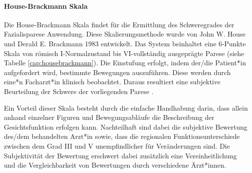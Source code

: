 \paragraph{House-Brackmann Skala} Die House-Brackmann Skala findet für die Ermittlung des Schweregrades der Fazialisparese Anwendung. Diese Skalierungsmethode wurde von John W. House und Derald E. Brackmann 1983 entwickelt. Das System beinhaltet eine 6-Punkte Skala von römisch I-Normalzustand bis VI-vollständig ausgeprägte Parese (siehe Tabelle \ref{cap:housebrackmann}). Die Einstufung erfolgt, indem der/die Patient*in aufgefordert wird, bestimmte Bewegungen auszuführen. Diese werden durch eine*n Facharzt*in klinisch beobachtet. Daraus resultiert eine subjektive Beurteilung der Schwere der vorliegenden Parese \cite{housebrackmann}.

Ein Vorteil dieser Skala besteht durch die einfache Handhabung darin, dass allein anhand einzelner Figuren und Bewegungsabläufe die Beschreibung der Gesichtsfunktion erfolgen kann. Nachteilhaft sind dabei die subjektive Bewertung des/dem behandelten Arzt*in sowie, dass die regionalen Funktionsunterschiede zwischen dem Grad III und V unempfindlicher für Veränderungen sind. Die Subjektivität der Bewertung erschwert dabei zusätzlich eine Vereinheitlichung und die Vergleichbarkeit von Bewertungen durch verschiedene Ärzt*innen.

